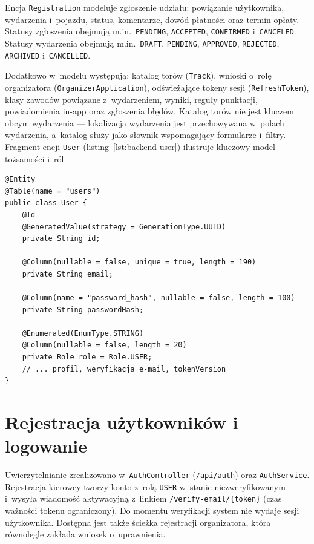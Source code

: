 \documentclass{sprz}
\begin{document}
Encja \texttt{Registration} modeluje zgłoszenie udziału: powiązanie użytkownika, wydarzenia i~pojazdu, status, komentarze, dowód płatności oraz termin opłaty. Statusy zgłoszenia obejmują m.in.\ \texttt{PENDING}, \texttt{ACCEPTED}, \texttt{CONFIRMED} i~\texttt{CANCELED}. Statusy wydarzenia obejmują m.in.\ \texttt{DRAFT}, \texttt{PENDING}, \texttt{APPROVED}, \texttt{REJECTED}, \texttt{ARCHIVED} i~\texttt{CANCELLED}.

Dodatkowo w~modelu występują: katalog torów (\texttt{Track}), wnioski o~rolę organizatora (\texttt{OrganizerApplication}), odświeżające tokeny sesji (\texttt{RefreshToken}), klasy zawodów powiązane z~wydarzeniem, wyniki, reguły punktacji, powiadomienia in-app oraz zgłoszenia błędów. Katalog torów nie jest kluczem obcym wydarzenia --- lokalizacja wydarzenia jest przechowywana w~polach wydarzenia, a~katalog służy jako słownik wspomagający formularze i~filtry. Fragment encji \texttt{User} (listing~\ref{lst:backend-user}) ilustruje kluczowy model tożsamości i~ról.

\begin{lstlisting}[caption={Kluczowe pola encji \texttt{User}},label={lst:backend-user}]
@Entity
@Table(name = "users")
public class User {
    @Id
    @GeneratedValue(strategy = GenerationType.UUID)
    private String id;

    @Column(nullable = false, unique = true, length = 190)
    private String email;

    @Column(name = "password_hash", nullable = false, length = 100)
    private String passwordHash;

    @Enumerated(EnumType.STRING)
    @Column(nullable = false, length = 20)
    private Role role = Role.USER;
    // ... profil, weryfikacja e-mail, tokenVersion
}
\end{lstlisting}

\section{Rejestracja użytkowników i logowanie}
Uwierzytelnianie zrealizowano w~\texttt{AuthController} (\texttt{/api/auth}) oraz \texttt{AuthService}. Rejestracja kierowcy tworzy konto z~rolą \texttt{USER} w~stanie niezweryfikowanym i~wysyła wiadomość aktywacyjną z~linkiem \texttt{/verify-email/\{token\}} (czas ważności tokenu ograniczony). Do momentu weryfikacji system nie wydaje sesji użytkownika. Dostępna jest także ścieżka rejestracji organizatora, która równolegle zakłada wniosek o~uprawnienia.
\end{document}

